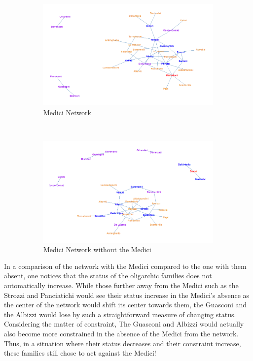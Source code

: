 \documentclass[12pt]{article}
\begin{document}
\begin{figure}
    \captionsetup[subfigure]{font=footnotesize,labelfont=footnotesize}
    \centering
     \begin{subfigure}[b]{1.0\textwidth}
        \includegraphics[width=1.0\textwidth]{Plots/medici.png}
            \caption{Medici Network}
            \label{fig:medici}
    \end{subfigure} \\
     \begin{subfigure}[b]{1.0\textwidth}
        \includegraphics[width=1.0\textwidth]{Plots/nomedici.png}
            \caption{Medici Network without the Medici}
            \label{fig:nomedici}
    \end{subfigure}
    \caption{}
    \label{fig:medici}
\end{figure}




In a comparison of the network with the Medici compared to the one with them absent, one notices that the status of the oligarchic families does not automatically increase. While those further away from the Medici such as the Strozzi and Panciatichi would see their status increase in the Medici’s absence as the center of the network would shift its center towards them, the Guasconi and the Albizzi would lose by such a straightforward measure of changing status. Considering the matter of constraint, The Guasconi and Albizzi would actually also become more constrained in the absence of the Medici from the network. Thus, in a situation where their status decreases and their constraint increase, these families still chose to act against the Medici! 
\end{document}
